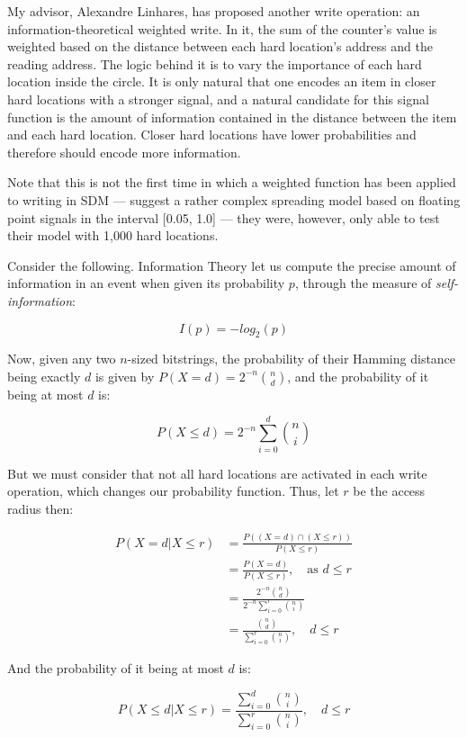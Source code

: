 My advisor, Alexandre Linhares, has proposed another write operation: an information-theoretical weighted write. In it, the sum of the counter's value is weighted based on the distance between each hard location's address and the reading address. The logic behind it is to vary the importance of each hard location inside the circle.  It is only natural that one encodes an item in closer hard locations with a stronger signal, and a natural candidate for this signal function is the amount of information contained in the distance between the item and each hard location.  Closer hard locations have lower probabilities and therefore should encode more information.

Note that this is not the first time in which a weighted function has been applied to writing in SDM --- \citet{hely1997new} suggest a rather complex spreading model based on floating point signals in the interval [0.05, 1.0] --- they were, however, only able to test their model with 1,000 hard locations.


Consider the following. Information Theory \citep{cover2012elements} let us compute the precise amount of information in an event when given its probability $p$, through the measure of \emph{self-information}:

$$
I(p)= -log_2(p)
$$

Now, given any two $n$-sized bitstrings, the probability of their Hamming distance being exactly $d$ is given by $P(X=d)= 2^{-n} \binom{n}{d}$, and the probability of it being at most $d$ is:

$$
P(X\leq d)= 2^{-n} {\displaystyle\sum_{i=0}^{d}{\binom{n}{i}}}
$$

But we must consider that not all hard locations are activated in each write operation, which changes our probability function. Thus, let $r$ be the access radius then:

\begin{align*}
P(X = d | X \leq r) &= \frac{P((X = d) \cap (X \leq r))}{P(X \leq r)} \\
    &= \frac{P(X = d)}{P(X \leq r)}, \quad \text{as $d \leq r$} \\
    &= \frac{ 2^{-n} \binom{n}{d} }{ 2^{-n} \sum_{i=0}^{r} \binom{n}{i} } \\
    &= \frac{\binom{n}{d}}{\sum_{i=0}^{r} \binom{n}{i}}, \quad d \leq r
\end{align*}

And the probability of it being at most $d$ is:

$$
P(X \leq d | X \leq r) = \frac{\sum_{i=0}^{d} \binom{n}{i}}{\sum_{i=0}^{r} \binom{n}{i}}, \quad d \leq r
$$

